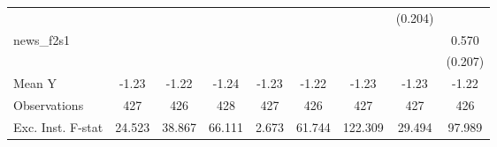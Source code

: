 {\begin{tabular}{l*{8}{c}}
            &                     &                     &                     &                     &                     &                     &     (0.204)         &                     \\
\addlinespace
news\_f2s1   &                     &                     &                     &                     &                     &                     &                     &       0.570\sym{***}\\
            &                     &                     &                     &                     &                     &                     &                     &     (0.207)         \\
\midrule
Mean Y      &       -1.23         &       -1.22         &       -1.24         &       -1.23         &       -1.22         &       -1.23         &       -1.23         &       -1.22         \\
Observations&         427         &         426         &         428         &         427         &         426         &         427         &         427         &         426         \\
Exc. Inst. F-stat&      24.523         &      38.867         &      66.111         &       2.673         &      61.744         &     122.309         &      29.494         &      97.989         \\
\bottomrule
\end{tabular}
}
